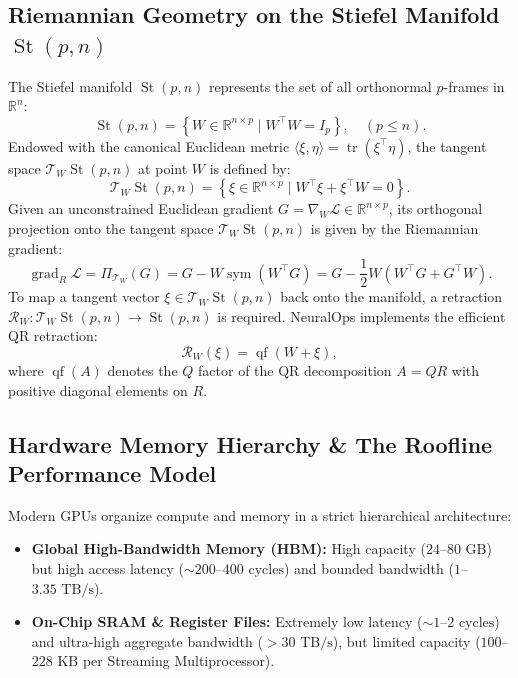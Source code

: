 \subsection{Riemannian Geometry on the Stiefel Manifold $\operatorname{St}(p, n)$}
The Stiefel manifold $\operatorname{St}(p, n)$ represents the set of all orthonormal $p$-frames in $\mathbb{R}^n$:
\begin{equation}
\operatorname{St}(p, n) = \left\{ W \in \mathbb{R}^{n \times p} \mid W^\top W = I_p \right\}, \quad (p \le n).
\end{equation}
Endowed with the canonical Euclidean metric $\langle \xi, \eta \rangle = \operatorname{tr}(\xi^\top \eta)$, the tangent space $\mathcal{T}_W \operatorname{St}(p, n)$ at point $W$ is defined by:
\begin{equation}
\mathcal{T}_W \operatorname{St}(p, n) = \left\{ \xi \in \mathbb{R}^{n \times p} \mid W^\top \xi + \xi^\top W = 0 \right\}.
\end{equation}
Given an unconstrained Euclidean gradient $G = \nabla_W \mathcal{L} \in \mathbb{R}^{n \times p}$, its orthogonal projection onto the tangent space $\mathcal{T}_W \operatorname{St}(p, n)$ is given by the Riemannian gradient:
\begin{equation}
\operatorname{grad}_R \mathcal{L} = \Pi_{\mathcal{T}_W}(G) = G - W \operatorname{sym}(W^\top G) = G - \frac{1}{2} W \left(W^\top G + G^\top W\right).
\end{equation}
To map a tangent vector $\xi \in \mathcal{T}_W \operatorname{St}(p, n)$ back onto the manifold, a retraction $\mathcal{R}_W: \mathcal{T}_W \operatorname{St}(p, n) \to \operatorname{St}(p, n)$ is required. NeuralOps implements the efficient QR retraction:
\begin{equation}
\mathcal{R}_W(\xi) = \operatorname{qf}(W + \xi),
\end{equation}
where $\operatorname{qf}(A)$ denotes the $Q$ factor of the QR decomposition $A = Q R$ with positive diagonal elements on $R$.

\subsection{Hardware Memory Hierarchy \& The Roofline Performance Model}
Modern GPUs organize compute and memory in a strict hierarchical architecture:
\begin{itemize}
    \item \textbf{Global High-Bandwidth Memory (HBM):} High capacity ($24$--$80\text{ GB}$) but high access latency ($\sim 200$--$400\text{ cycles}$) and bounded bandwidth ($1$--$3.35\text{ TB/s}$).
    \item \textbf{On-Chip SRAM \& Register Files:} Extremely low latency ($\sim 1$--$2\text{ cycles}$) and ultra-high aggregate bandwidth ($>30\text{ TB/s}$), but limited capacity ($100$--$228\text{ KB}$ per Streaming Multiprocessor).
\end{itemize}

